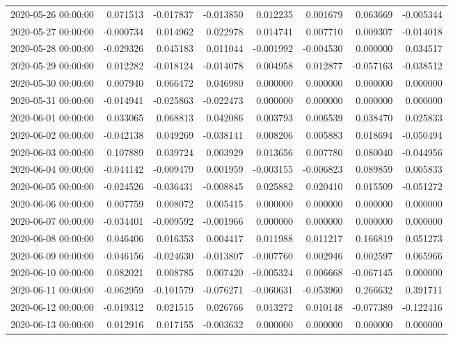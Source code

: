 \begin{tabular}{lrrrrrrr}
2020-05-26 00:00:00 & 0.071513 & -0.017837 & -0.013850 & 0.012235 & 0.001679 & 0.063669 & -0.005344 \\
2020-05-27 00:00:00 & -0.000734 & 0.014962 & 0.022978 & 0.014741 & 0.007710 & 0.009307 & -0.014018 \\
2020-05-28 00:00:00 & -0.029326 & 0.045183 & 0.011044 & -0.001992 & -0.004530 & 0.000000 & 0.034517 \\
2020-05-29 00:00:00 & 0.012282 & -0.018124 & -0.014078 & 0.004958 & 0.012877 & -0.057163 & -0.038512 \\
2020-05-30 00:00:00 & 0.007940 & 0.066472 & 0.046980 & 0.000000 & 0.000000 & 0.000000 & 0.000000 \\
2020-05-31 00:00:00 & -0.014941 & -0.025863 & -0.022473 & 0.000000 & 0.000000 & 0.000000 & 0.000000 \\
2020-06-01 00:00:00 & 0.033065 & 0.068813 & 0.042086 & 0.003793 & 0.006539 & 0.038470 & 0.025833 \\
2020-06-02 00:00:00 & -0.042138 & 0.049269 & -0.038141 & 0.008206 & 0.005883 & 0.018694 & -0.050494 \\
2020-06-03 00:00:00 & 0.107889 & 0.039724 & 0.003929 & 0.013656 & 0.007780 & 0.080040 & -0.044956 \\
2020-06-04 00:00:00 & -0.044142 & -0.009479 & 0.001959 & -0.003155 & -0.006823 & 0.089859 & 0.005833 \\
2020-06-05 00:00:00 & -0.024526 & -0.036431 & -0.008845 & 0.025882 & 0.020410 & 0.015509 & -0.051272 \\
2020-06-06 00:00:00 & 0.007759 & 0.008072 & 0.005415 & 0.000000 & 0.000000 & 0.000000 & 0.000000 \\
2020-06-07 00:00:00 & -0.034401 & -0.009592 & -0.001966 & 0.000000 & 0.000000 & 0.000000 & 0.000000 \\
2020-06-08 00:00:00 & 0.046406 & 0.016353 & 0.004417 & 0.011988 & 0.011217 & 0.166819 & 0.051273 \\
2020-06-09 00:00:00 & -0.046156 & -0.024630 & -0.013807 & -0.007760 & 0.002946 & 0.002597 & 0.065966 \\
2020-06-10 00:00:00 & 0.082021 & 0.008785 & 0.007420 & -0.005324 & 0.006668 & -0.067145 & 0.000000 \\
2020-06-11 00:00:00 & -0.062959 & -0.101579 & -0.076271 & -0.060631 & -0.053960 & 0.266632 & 0.391711 \\
2020-06-12 00:00:00 & -0.019312 & 0.021515 & 0.026766 & 0.013272 & 0.010148 & -0.077389 & -0.122416 \\
2020-06-13 00:00:00 & 0.012916 & 0.017155 & -0.003632 & 0.000000 & 0.000000 & 0.000000 & 0.000000 \\

\end{tabular}
